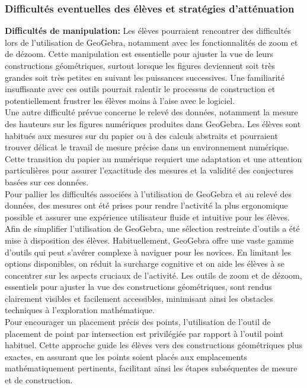 \subsubsection{Difficultés eventuelles des élèves et stratégies d'atténuation}

\textbf{Difficultés de manipulation:}
Les élèves pourraient rencontrer des difficultés lors de l'utilisation de GeoGebra,
notamment avec les fonctionnalités de zoom et de dézoom.
Cette manipulation est essentielle pour ajuster la vue de leurs constructions géométriques,
surtout lorsque les figures deviennent soit très grandes soit très petites en suivant les puissances successives.
Une familiarité insuffisante avec ces outils pourrait ralentir le processus de construction et potentiellement frustrer les élèves moins à l'aise avec le logiciel.\\

Une autre difficulté prévue concerne le relevé des données,
notamment la mesure des hauteurs sur les figures numériques produites dans GeoGebra.
Les élèves sont habitués aux mesures sur du papier ou à des calculs abstraits et pourraient trouver délicat le travail de mesure précise dans un environnement numérique.
Cette transition du papier au numérique requiert une adaptation et une attention particulières pour assurer l'exactitude des mesures et la validité des conjectures basées sur ces données.\\

Pour pallier les difficultés associées à l'utilisation de GeoGebra et au relevé des données,
des mesures ont été prises pour rendre l'activité la plus ergonomique possible et assurer une expérience utilisateur fluide et intuitive pour les élèves.\\

Afin de simplifier l'utilisation de GeoGebra,
une sélection restreinte d'outils a été mise à disposition des élèves.
Habituellement,
GeoGebra offre une vaste gamme d'outils qui peut s'avérer complexe à naviguer pour les novices.
En limitant les options disponibles,
on réduit la surcharge cognitive et on aide les élèves à se concentrer sur les aspects cruciaux de l'activité.
Les outils de zoom et de dézoom,
essentiels pour ajuster la vue des constructions géométriques,
sont rendus clairement visibles et facilement accessibles,
minimisant ainsi les obstacles techniques à l'exploration mathématique.\\

Pour encourager un placement précis des points,
l'utilisation de l'outil de placement de point par intersection est privilégiée par rapport à l'outil point habituel.
Cette approche guide les élèves vers des constructions géométriques plus exactes,
en assurant que les points soient placés aux emplacements mathématiquement pertinents,
facilitant ainsi les étapes subséquentes de mesure et de construction.\\

